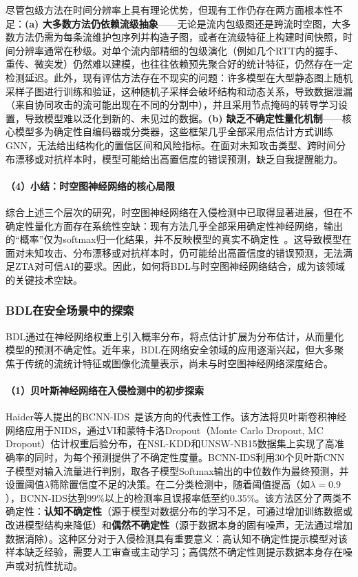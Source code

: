 尽管包级方法在时间分辨率上具有理论优势，但现有工作仍存在两方面根本性不足：\textbf{(a) 大多数方法仍依赖流级抽象}——无论是流内包级图还是跨流时空图，大多数方法仍需为每条流维护包序列并构造子图，或者在流级特征上构建时间快照，时间分辨率通常在秒级。对单个流内部精细的包级演化（例如几个RTT内的握手、重传、微突发）仍然难以建模，也往往依赖预先聚合好的统计特征，仍然存在一定检测延迟。此外，现有评估方法存在不现实的问题：许多模型在大型静态图上随机采样子图进行训练和验证，这种随机子采样会破坏结构和动态关系，导致数据泄漏（来自协同攻击的流可能出现在不同的分割中），并且采用节点掩码的转导学习设置，导致模型难以泛化到新的、未见过的数据。\textbf{(b) 缺乏不确定性量化机制}——核心模型多为确定性自编码器或分类器，这些框架几乎全部采用点估计方式训练GNN，无法给出结构化的置信区间和风险指标。在面对未知攻击类型、跨时间分布漂移或对抗样本时，模型可能给出高置信度的错误预测，缺乏自我提醒能力。

\paragraph{（4）小结：时空图神经网络的核心局限}

综合上述三个层次的研究，时空图神经网络在入侵检测中已取得显著进展，但在不确定性量化方面存在系统性空缺：现有方法几乎全部采用确定性神经网络，输出的``概率''仅为softmax归一化结果，并不反映模型的真实不确定性~\cite{BCNN-IDS,Tabarisaadi2024}。这导致模型在面对未知攻击、分布漂移或对抗样本时，仍可能给出高置信度的错误预测，无法满足ZTA对可信AI的要求。因此，如何将BDL与时空图神经网络结合，成为该领域的关键技术空缺。


\subsubsection{BDL在安全场景中的探索}

BDL通过在神经网络权重上引入概率分布，将点估计扩展为分布估计，从而量化模型的预测不确定性。近年来，BDL在网络安全领域的应用逐渐兴起，但大多聚焦于传统的流统计特征或图像化流量表示，尚未与时空图神经网络深度结合。

\paragraph{（1）贝叶斯神经网络在入侵检测中的初步探索}

Haider等人提出的BCNN-IDS~\cite{BCNN-IDS}是该方向的代表性工作。该方法将贝叶斯卷积神经网络应用于NIDS，通过VI和蒙特卡洛Dropout（Monte Carlo Dropout, MC Dropout）估计权重后验分布，在NSL-KDD和UNSW-NB15数据集上实现了高准确率的同时，为每个预测提供了不确定性度量。BCNN-IDS利用30个贝叶斯CNN子模型对输入流量进行判别，取各子模型Softmax输出的中位数作为最终预测，并设置阈值$\lambda$筛除置信度不足的决策。在二分类检测中，随着阈值提高（如$\lambda=0.9$），BCNN-IDS达到99\%以上的检测率且误报率低至约0.35\%。该方法区分了两类不确定性：\textbf{认知不确定性}（源于模型对数据分布的学习不足，可通过增加训练数据或改进模型结构来降低）和\textbf{偶然不确定性}（源于数据本身的固有噪声，无法通过增加数据消除）。这种区分对于入侵检测具有重要意义：高认知不确定性提示模型对该样本缺乏经验，需要人工审查或主动学习；高偶然不确定性则提示数据本身存在噪声或对抗性扰动。

